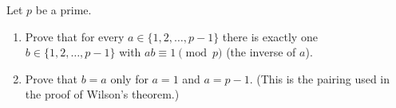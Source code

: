 Let $p$ be a prime.
\begin{enumerate}
\item[(a)] Prove that for every $a\in\{1,2,\dots,p-1\}$ there is exactly one $b\in\{1,2,\dots,p-1\}$ with $ab\equiv1\pmod p$ (the inverse of $a$).
\item[(b)] Prove that $b=a$ only for $a=1$ and $a=p-1$. (This is the pairing used in the proof of Wilson's theorem.)
\end{enumerate}
